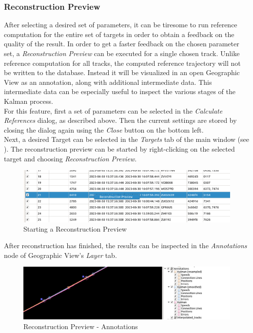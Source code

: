 \subsubsection{Reconstruction Preview}
\label{sec:ui_proc_calc_references_preview}

After selecting a desired set of parameters, it can be tiresome to run reference computation for the entire 
set of targets in order to obtain a feedback on the quality of the result. In order to get a faster feedback on the 
chosen parameter set, a \textit{Reconstruction Preview} can be executed for a single chosen track. 
Unlike reference computation for all tracks, the computed reference trajectory will not be written to the database.
Instead it will be visualized in an open Geographic View as an annotation, along with additional intermediate data.
This intermediate data can be especially useful to inspect the various stages of the Kalman process. \\

For this feature, first a set of parameters can be selected in the \textit{Calculate References} dialog, as described above.
Then the current settings are stored by closing the dialog again using the \textit{Close} button on the bottom left. \\

Next, a desired Target can be selected in the \textit{Targets} tab of the main window (see ).
The reconstruction preview can be started by right-clicking on the selected target and choosing \textit{Reconstruction Preview}.

\begin{figure}[H]
    \center
      \includegraphics[frame,width=16cm]{figures/ui_task_references_recprev_start.png}
    \caption{Starting a Reconstruction Preview} 
\end{figure}

After reconstruction has finished, the results can be inspected in the \textit{Annotations} node of Geographic View's \textit{Layer} tab.

\begin{figure}[H]
    \center
      \includegraphics[frame,width=16cm]{figures/ui_task_references_recprev_anno.png}
    \caption{Reconstruction Preview - Annotations} 
\end{figure}


